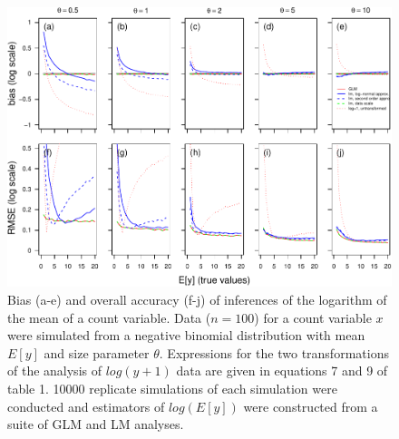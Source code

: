 \documentclass[]{article}
\begin{document}
\begin{figure}[h]

{\centering \includegraphics{revisiting_count_data_advice_files/figure-latex/biasAndRmseFigureLog-1} 

}

\caption{Bias (a-e) and overall accuracy (f-j) of inferences of the logarithm of the mean of a count variable.  Data ($n=100$) for a count variable $x$ were simulated from a negative binomial distribution with mean $E[y]$ and size parameter $\theta$.  Expressions for the two transformations of the analysis of $log(y+1)$ data are given in equations 7 and 9 of table 1. 10000 replicate simulations of each simulation were conducted and estimators of $log(E[y])$ were constructed from a suite of GLM and LM analyses.}\label{fig:biasAndRmseFigureLog}
\end{figure}
\end{document}
